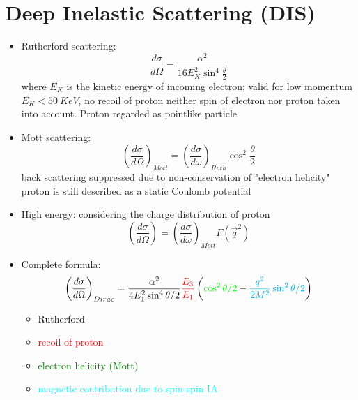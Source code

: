\section{Deep Inelastic Scattering (DIS)}
\begin{itemize}
    \item Rutherford scattering: 
	$$ \frac{d\sigma}{d\Omega} = \frac{\alpha^2}{16 E^2_K \sin^4\frac{\theta}{2}}$$
	where $E_K$ is the kinetic energy of incoming electron; valid for low momentum 
	$E_K < 50\ KeV$, no recoil of proton neither spin of electron nor proton 
	taken into account. Proton regarded as pointlike particle
    \item Mott scattering:
	$$ \left( \frac{d\sigma}{d\Omega} \right)_{Mott} = \left( \frac{d\sigma}{d\omega}\right)_{Ruth} \cos^2\frac{\theta}{2} $$
	back scattering suppressed due to non-conservation of "electron helicity"
	proton is still described as a static Coulomb potential
    \item High energy: considering the charge distribution of proton
	$$ \left( \frac{d\sigma}{d\Omega} \right) = \left( \frac{d\sigma}{d\omega}\right)_{Mott} F(\vec{q}^2) $$
    \item Complete formula:
	\begin{equation*}
	    \left( \frac{d\sigma}{d\Omega} \right)_{Dirac} = 
	    \textcolor{black}{\frac{\alpha^2}{4E_1^2\sin^4\theta/2}}
	    \textcolor{red}{\frac{E_3}{E_1}}
	    \left( \textcolor{green}{\cos^2\theta/2} -
	    \textcolor{cyan}{\frac{q^2}{2M^2}\sin^2\theta/2}
            \right)
	\end{equation*}
	\begin{itemize}
	    \item \textcolor{black}{Rutherford}
	    \item \textcolor{red}{recoil of proton}
	    \item \textcolor{green}{electron helicity (Mott)}
	    \item \textcolor{cyan}{magnetic contribution due to spin-spin IA}
	\end{itemize}
\end{itemize}


